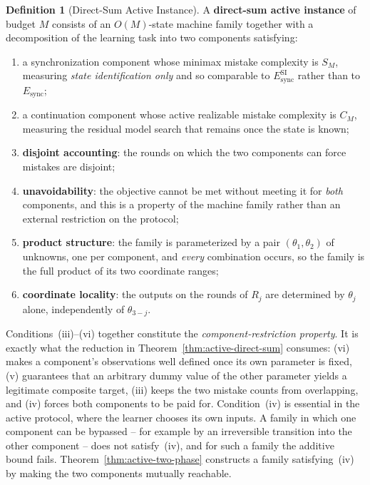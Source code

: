 \documentclass[12pt]{article}
\theoremstyle{definition}
\newtheorem{definition}[theorem]{Definition}
\newcommand{\Esync}{E_{\mathrm{sync}}}
\newcommand{\EsyncSI}{E_{\mathrm{sync}}^{\mathrm{SI}}}
\begin{document}
\begin{definition}[Direct-Sum Active Instance]
\label{def:direct-sum-active}
A \textbf{direct-sum active instance} of budget $M$ consists of an
$O(M)$-state machine family together with a decomposition of the learning task
into two components satisfying:
\begin{enumerate}[label=(\roman*)]
\item a synchronization component whose minimax mistake complexity is $S_M$,
measuring \emph{state identification only} and so comparable to
$\EsyncSI$ rather than to $\Esync$;
\item a continuation component whose active realizable mistake complexity is
$C_M$, measuring the residual model search that remains once the state is
known;
\item \textbf{disjoint accounting}: the rounds on which the two components can
force mistakes are disjoint;
\item \textbf{unavoidability}: the objective cannot be met without meeting it
for \emph{both} components, and this is a property of the machine family
rather than an external restriction on the protocol;
\item \textbf{product structure}: the family is parameterized by a pair
$(\theta_1,\theta_2)$ of unknowns, one per component, and \emph{every}
combination occurs, so the family is the full product of its two coordinate
ranges;
\item \textbf{coordinate locality}: the outputs on the rounds of $R_j$ are
determined by $\theta_j$ alone, independently of $\theta_{3-j}$.
\end{enumerate}
Conditions~(iii)--(vi) together constitute the \emph{component-restriction
property}.  It is exactly what the reduction in
Theorem~\ref{thm:active-direct-sum} consumes: (vi) makes a component's
observations well defined once its own parameter is fixed, (v) guarantees that
an arbitrary dummy value of the other parameter yields a legitimate composite
target, (iii) keeps the two mistake counts from overlapping, and (iv) forces
both components to be paid for.
Condition~(iv) is essential in the active protocol, where the learner chooses
its own inputs.  A family in which one component can be bypassed -- for
example by an irreversible transition into the other component -- does not
satisfy~(iv), and for such a family the additive bound fails.
Theorem~\ref{thm:active-two-phase} constructs a family satisfying~(iv) by
making the two components mutually reachable.
\end{definition}
\end{document}
